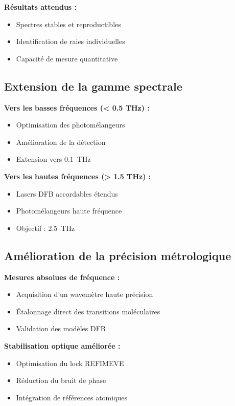 \textbf{Résultats attendus :}
\begin{itemize}
    \item Spectres stables et reproductibles
    \item Identification de raies individuelles
    \item Capacité de mesure quantitative
\end{itemize}

\subsection{Extension de la gamme spectrale}

\textbf{Vers les basses fréquences (< 0.5 THz) :}
\begin{itemize}
    \item Optimisation des photomélangeurs
    \item Amélioration de la détection
    \item Extension vers \SI{0.1}{\THz}
\end{itemize}

\textbf{Vers les hautes fréquences (> 1.5 THz) :}
\begin{itemize}
    \item Lasers DFB accordables étendus
    \item Photomélangeurs haute fréquence
    \item Objectif : \SI{2.5}{\THz}
\end{itemize}

\subsection{Amélioration de la précision métrologique}

\textbf{Mesures absolues de fréquence :}
\begin{itemize}
    \item Acquisition d'un wavemètre haute précision
    \item Étalonnage direct des transitions moléculaires
    \item Validation des modèles DFB
\end{itemize}

\textbf{Stabilisation optique améliorée :}
\begin{itemize}
    \item Optimisation du lock REFIMEVE
    \item Réduction du bruit de phase
    \item Intégration de références atomiques
\end{itemize}

